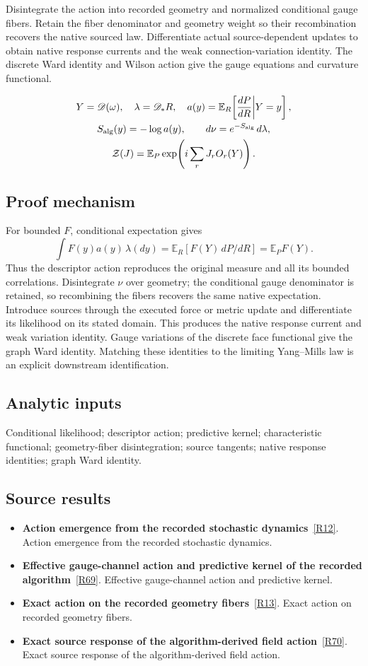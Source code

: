 \documentclass[11pt,a4paper]{article}
\begin{document}
Disintegrate the action into recorded geometry and normalized conditional gauge fibers. Retain the fiber denominator and geometry weight so their recombination recovers the native sourced law. Differentiate actual source-dependent updates to obtain native response currents and the weak connection-variation identity. The discrete Ward identity and Wilson action give the gauge equations and curvature functional.


\begin{gather*}
Y=\mathscr D(\omega),\quad \lambda=\mathscr D_*R,\quad
a(y)=\mathbb E_R\!\left[\frac{dP}{dR}\middle|Y=y\right],\\
S_{\rm alg}(y)=-\log a(y),\qquad d\nu=e^{-S_{\rm alg}}\,d\lambda,\\
\mathcal Z(J)=\mathbb E_P\exp\!\left(i\sum_rJ_rO_r(Y)\right).
\end{gather*}
\subsection*{Proof mechanism}
For bounded \(F\), conditional expectation gives
\[\int F(y)a(y)\,\lambda(dy)=\mathbb E_R[F(Y)\,dP/dR]=\mathbb E_PF(Y).\]
Thus the descriptor action reproduces the original measure and all its bounded correlations. Disintegrate \(\nu\) over geometry; the conditional gauge denominator is retained, so recombining the fibers recovers the same native expectation. Introduce sources through the executed force or metric update and differentiate its likelihood on its stated domain. This produces the native response current and weak variation identity. Gauge variations of the discrete face functional give the graph Ward identity. Matching these identities to the limiting Yang--Mills law is an explicit downstream identification.
\subsection*{Analytic inputs}
Conditional likelihood; descriptor action; predictive kernel; characteristic functional; geometry-fiber disintegration; source tangents; native response identities; graph Ward identity.
\subsection*{Source results}
\begin{itemize}
\item \textbf{Action emergence from the recorded stochastic dynamics}~\hyperref[src:thm-ym-recorded-action-emergence]{[R12]}. Action emergence from the recorded stochastic dynamics.
\item \textbf{Effective gauge-channel action and predictive kernel of the recorded algorithm}~\hyperref[src:thm-sm-effective-recorded-gauge-dynamics]{[R69]}. Effective gauge-channel action and predictive kernel.
\item \textbf{Exact action on the recorded geometry fibers}~\hyperref[src:thm-ym-native-geometry-fiber-action]{[R13]}. Exact action on recorded geometry fibers.
\item \textbf{Exact source response of the algorithm-derived field action}~\hyperref[src:thm-ym-native-source-response]{[R70]}. Exact source response of the algorithm-derived field action.
\end{itemize}
\end{document}
